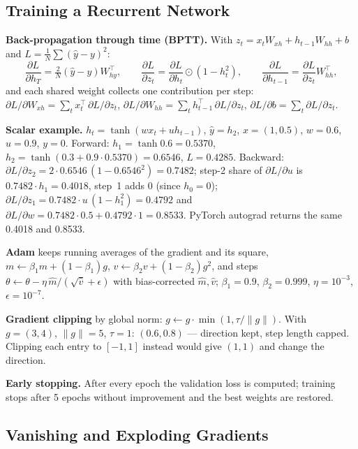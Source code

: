 \documentclass[11pt, a4paper]{article}
\begin{document}
\subsection{Training a Recurrent Network}
\label{sec:train}

\textbf{Back-propagation through time (BPTT).} With $z_t=x_tW_{xh}+h_{t-1}W_{hh}+b$ and $L=\frac1N\sum(\hat y-y)^2$:
\begin{equation}
\frac{\partial L}{\partial h_T}=\tfrac2N(\hat y-y)W_{hy}^\top,\qquad
\frac{\partial L}{\partial z_t}=\frac{\partial L}{\partial h_t}\odot(1-h_t^2),\qquad
\frac{\partial L}{\partial h_{t-1}}=\frac{\partial L}{\partial z_t}W_{hh}^\top,
\label{eq:bptt}
\end{equation}
and each shared weight collects one contribution per step:
$\partial L/\partial W_{xh}=\sum_tx_t^\top\,\partial L/\partial z_t$, $\partial L/\partial W_{hh}=\sum_th_{t-1}^\top\,\partial L/\partial z_t$, $\partial L/\partial b=\sum_t\partial L/\partial z_t$.

\textbf{Scalar example.} $h_t=\tanh(wx_t+uh_{t-1})$, $\hat y=h_2$, $x=(1,0.5)$, $w=0.6$, $u=0.9$, $y=0$. Forward: $h_1=\tanh0.6=0.5370$, $h_2=\tanh(0.3+0.9\cdot0.5370)=0.6546$,
$L=0.4285$. Backward: $\partial L/\partial z_2=2\cdot0.6546\,(1-0.6546^2)=0.7482$; step-2 share of $\partial L/\partial u$ is $0.7482\cdot h_1=0.4018$, step~1 adds $0$ (since $h_0=0$);
$\partial L/\partial z_1=0.7482\cdot u\,(1-h_1^2)=0.4792$ and $\partial L/\partial w=0.7482\cdot0.5+0.4792\cdot1=0.8533$. PyTorch autograd returns the same 0.4018 and 0.8533.

\textbf{Adam} keeps running averages of the gradient and its square, $m\leftarrow\beta_1m+(1-\beta_1)g$, $v\leftarrow\beta_2v+(1-\beta_2)g^2$, and steps
$\theta\leftarrow\theta-\eta\,\hat m/(\sqrt{\hat v}+\epsilon)$ with bias-corrected $\hat m,\hat v$; $\beta_1=0.9$, $\beta_2=0.999$, $\eta=10^{-3}$, $\epsilon=10^{-7}$.

\textbf{Gradient clipping} by global norm: $g\leftarrow g\cdot\min(1,\tau/\lVert g\rVert)$. With $g=(3,4)$, $\lVert g\rVert=5$, $\tau=1$: $(0.6,0.8)$ — direction kept, step length capped.
Clipping each entry to $[-1,1]$ instead would give $(1,1)$ and change the direction.

\textbf{Early stopping.} After every epoch the validation loss is computed; training stops after 5 epochs without improvement and the best weights are restored.

\subsection{Vanishing and Exploding Gradients}
\label{sec:vanish}
\end{document}
